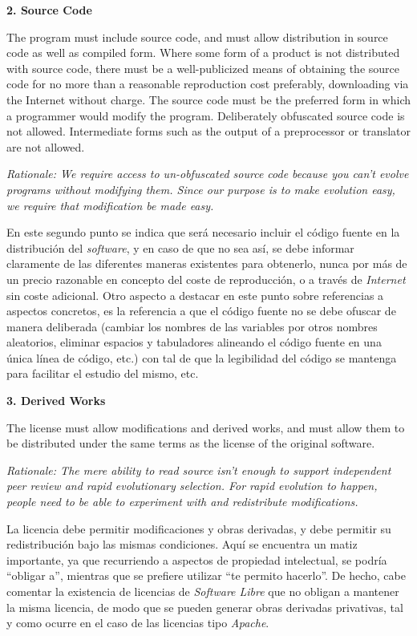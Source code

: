 {\bf 2. Source Code

The program must include source code, and must allow distribution in source code
as well as compiled form. Where some form of a product is not distributed with
source code, there must be a well-publicized means of obtaining the source code
for no more than a reasonable reproduction cost preferably, downloading via the
Internet without charge. The source code must be the preferred form in which a
programmer would modify the program. Deliberately obfuscated source code is not
allowed. Intermediate forms such as the output of a preprocessor or translator
are not allowed.}

\textit{Rationale: We require access to un-obfuscated source code because you
can't evolve programs without modifying them. Since our purpose is to make
evolution easy, we require that modification be made easy.}\newline

En este segundo punto se indica que será necesario incluir el código fuente en
la distribución del \textit{software}, y en caso de que no sea así, se debe
informar claramente de las diferentes maneras existentes para obtenerlo, nunca
por más de un precio razonable en concepto del coste de reproducción, o a través
de \textit{Internet} sin coste adicional. Otro aspecto a destacar en este punto
sobre referencias a aspectos concretos, es la referencia a que el código fuente
no se debe ofuscar de manera deliberada (cambiar los nombres de las variables
por otros nombres aleatorios, eliminar espacios y tabuladores alineando el
código fuente en una única línea de código, etc.) con tal de que la legibilidad
del código se mantenga para facilitar el estudio del mismo, etc.\newline

{\bf 3. Derived Works

The license must allow modifications and derived works, and must allow them to
be distributed under the same terms as the license of the original software.}

\textit{Rationale: The mere ability to read source isn't enough to support
independent peer review and rapid evolutionary selection. For rapid evolution to
happen, people need to be able to experiment with and redistribute
modifications.}\newline

La licencia debe permitir modificaciones y obras derivadas, y debe permitir su
redistribución bajo las mismas condiciones. Aquí se encuentra un matiz
importante, ya que recurriendo a aspectos de propiedad intelectual, se podría
``obligar a'', mientras que se prefiere utilizar ``te permito
hacerlo''. De hecho, cabe comentar la existencia de licencias de
\textit{Software Libre} que no obligan a mantener la misma licencia, de modo que
se pueden generar obras derivadas privativas, tal y como ocurre en el caso de
las licencias tipo \textit{Apache}.\newline

